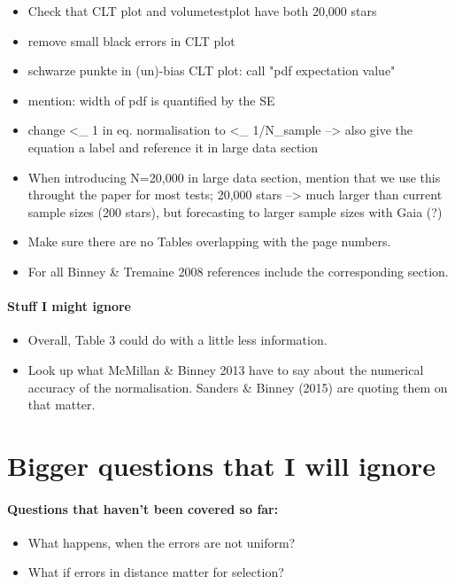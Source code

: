 \begin{itemize}
\item Check that CLT plot and volumetestplot have both 20,000 stars
\item remove small black errors in CLT plot
\item schwarze punkte in (un)-bias CLT plot: call "pdf expectation value"
\item mention: width of pdf is quantified by the SE
\item change <_ 1 in eq. normalisation to <_ 1/N_sample --> also give the equation a label and reference it in large data section
\item When introducing N=20,000 in large data section, mention that we use this throught the paper for most tests; 20,000 stars --> much larger than current sample sizes (200 stars), but forecasting to larger sample sizes with Gaia (?)
\item Make sure there are no Tables overlapping with the page numbers.
\item For all Binney \& Tremaine 2008 references include the corresponding section.
\end{itemize}

\paragraph{Stuff I might ignore}
\begin{itemize}
\item Overall, Table 3 could do with a little less information.
\item Look up what McMillan \& Binney 2013 have to say about the numerical accuracy of the normalisation. Sanders \& Binney (2015) are quoting them on that matter.
\end{itemize}



\section{Bigger questions that I will ignore}

\paragraph{Questions that haven't been covered so far:}
\begin{itemize}
\item What happens, when the errors are not uniform?
\item What if errors in distance matter for selection?
\end{itemize}

